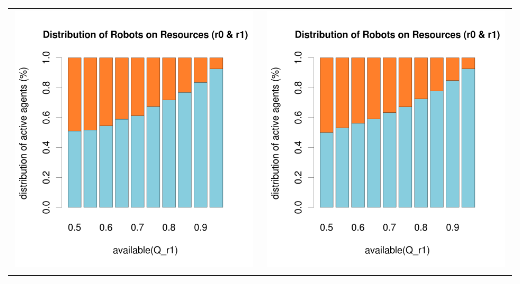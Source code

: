 \documentclass[a4paper,10pt]{article}
\begin{document}
\begin{table}[H]
\begin{tabular}{cc}
\includegraphics[width=\imgSize]{../images/5StaticEnv/barplotAliveR1AndR2_mean_env4_normalized}& \includegraphics[width=\imgSize]{../images/5StaticEnv/barplotAliveR1AndR2_median_env4_normalized}
\end{tabular}
\end{table}
\end{document}
